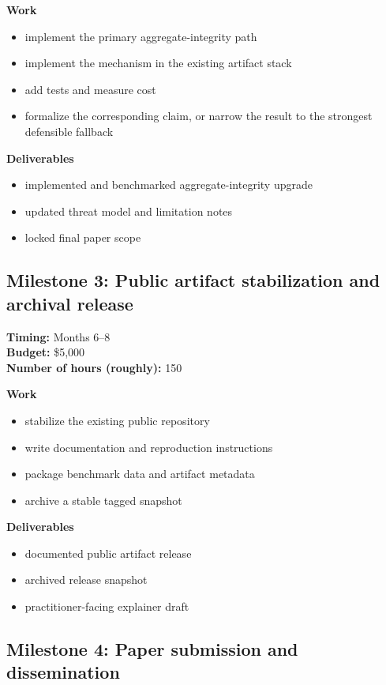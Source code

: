 \documentclass[11pt]{article}
\begin{document}
\textbf{Work}
\begin{itemize}[leftmargin=*,nosep]
\item implement the primary aggregate-integrity path
\item implement the mechanism in the existing artifact stack
\item add tests and measure cost
\item formalize the corresponding claim, or narrow the result to the strongest
      defensible fallback
\end{itemize}

\textbf{Deliverables}
\begin{itemize}[leftmargin=*,nosep]
\item implemented and benchmarked aggregate-integrity upgrade
\item updated threat model and limitation notes
\item locked final paper scope
\end{itemize}

\subsection*{Milestone 3: Public artifact stabilization and archival release}

\textbf{Timing:} Months 6--8\\
\textbf{Budget:} \$5{,}000\\
\textbf{Number of hours (roughly):} 150

\textbf{Work}
\begin{itemize}[leftmargin=*,nosep]
\item stabilize the existing public repository
\item write documentation and reproduction instructions
\item package benchmark data and artifact metadata
\item archive a stable tagged snapshot
\end{itemize}

\textbf{Deliverables}
\begin{itemize}[leftmargin=*,nosep]
\item documented public artifact release
\item archived release snapshot
\item practitioner-facing explainer draft
\end{itemize}

\subsection*{Milestone 4: Paper submission and dissemination}
\end{document}
